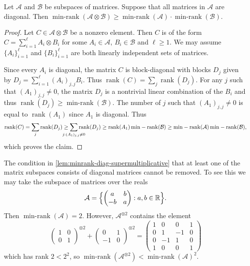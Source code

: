 \documentclass{daj}
\newcommand{\RR}{\mathbb{R}}
\DeclareMathOperator{\rank}{rank} \DeclareMathOperator{\col}{colspan}
\DeclareMathOperator{\minrnk}{min-rank}
\begin{document}
%
%

\begin{lemma}\label{lem:minrank-diag-supermultiplicative}
    Let $\mathcal{A}$ and $\mathcal{B}$ be subspaces of matrices. Suppose that all matrices in $\mathcal{A}$ are diagonal.
    Then %
$\minrnk(\mathcal{A}\otimes\mathcal{B})\geq\minrnk(\mathcal{A})\cdot\minrnk(\mathcal{B})$.
\end{lemma}
%
\begin{proof}%
    Let $C\in\mathcal{A}\otimes\mathcal{B}$ be a nonzero element. Then $C$ is of the form $C =\sum_{i=1}^\ell A_i\otimes B_i$ for some $A_i \in \mathcal{A}$, $B_i \in \mathcal{B}$ and $\ell \geq 1$. We may assume $\{A_i\}_{i=1}^\ell$ and $\{B_i\}_{i=1}^\ell$ are both linearly independent sets of matrices.  %

    Since every $A_i$ is diagonal, the matrix $C$ is block-diagonal with blocks $D_j$ given by $D_j = \sum_{i=1}^\ell (A_i)_{j,j} B_i$. Thus $\rank(C) = \sum_j \rank(D_j)$. For any $j$ such that $(A_1)_{j,j} \neq 0$, the matrix $D_j$ is a nontrivial linear combination of the $B_i$ and thus $\rank(D_j) \geq \minrnk(\mathcal{B})$. The number of $j$ such that $(A_1)_{j,j} \neq0$ is equal to $\rank(A_1)$ since $A_1$ is diagonal. %
    Thus
    \[
    \rank(C) = \sum_j \rank(D_j) \geq \sum_{\mathclap{j: (A_1)_{j,j} \neq 0}} \rank(D_j) %
    \geq \rank(A_1)\minrnk(\mathcal{B}) \geq \minrnk(\mathcal{A})\minrnk(\mathcal{B}),
    \]
    which proves the claim. %
%
%
\end{proof}
%
\begin{example}\label{ex:minrank-not-supermultiplicative}
    The condition in \autoref{lem:minrank-diag-supermultiplicative} that at least one of the matrix subspaces consists of diagonal matrices cannot be removed. To see this we may take the subspace of matrices over the reals
    \[
\mathcal{A} = \Bigl\{\begin{pmatrix}
    a & b\\-b & a
\end{pmatrix} : a,b \in \RR\Bigr\}.
    \]
    Then $\minrnk(\mathcal{A}) = 2$. However, $\mathcal{A}^{\otimes 2}$ contains the element
    \[
    \begin{pmatrix}
        1 & 0\\0 & 1
    \end{pmatrix}^{\otimes 2}
    +
    \begin{pmatrix}
        0 & 1\\-1 & 0
    \end{pmatrix}^{\otimes 2}
     = \begin{pmatrix}
         1 & 0 & 0 & 1\\
         0 & 1 & -1 & 0\\
         0 & -1 & 1 & 0\\
         1 & 0 & 0 & 1
     \end{pmatrix}
    \]
    which has rank $2 < 2^2$, so $\minrnk(\mathcal{A}^{\otimes 2}) < \minrnk(\mathcal{A})^2$.
\end{example}
\end{document}
